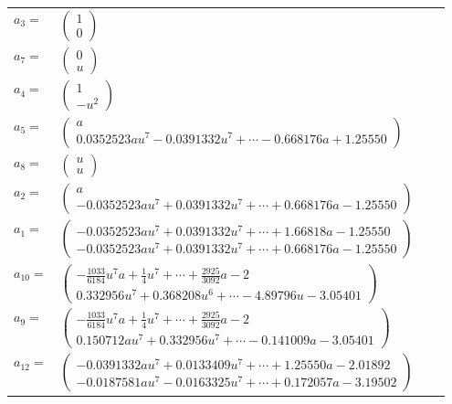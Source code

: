 \documentclass[1p]{elsarticle_modified}
\theoremstyle{definition}
\begin{document}
\begin{tabular}{m{7pt} m{180pt} m{7pt} m{180pt} }
\flushright $a_{3}=$&$\begin{pmatrix}1\\0\end{pmatrix}$ \\
\flushright $a_{7}=$&$\begin{pmatrix}0\\u\end{pmatrix}$ \\
\flushright $a_{4}=$&$\begin{pmatrix}1\\- u^2\end{pmatrix}$ \\
\flushright $a_{5}=$&$\begin{pmatrix}a\\0.0352523 a u^{7}-0.0391332 u^{7}+\cdots-0.668176 a+1.25550\end{pmatrix}$ \\
\flushright $a_{8}=$&$\begin{pmatrix}u\\u\end{pmatrix}$ \\
\flushright $a_{2}=$&$\begin{pmatrix}a\\-0.0352523 a u^{7}+0.0391332 u^{7}+\cdots+0.668176 a-1.25550\end{pmatrix}$ \\
\flushright $a_{1}=$&$\begin{pmatrix}-0.0352523 a u^{7}+0.0391332 u^{7}+\cdots+1.66818 a-1.25550\\-0.0352523 a u^{7}+0.0391332 u^{7}+\cdots+0.668176 a-1.25550\end{pmatrix}$ \\
\flushright $a_{10}=$&$\begin{pmatrix}-\frac{1033}{6184} u^7 a+\frac{1}{4} u^7+\cdots+\frac{2925}{3092} a-2\\0.332956 u^{7}+0.368208 u^{6}+\cdots-4.89796 u-3.05401\end{pmatrix}$ \\
\flushright $a_{9}=$&$\begin{pmatrix}-\frac{1033}{6184} u^7 a+\frac{1}{4} u^7+\cdots+\frac{2925}{3092} a-2\\0.150712 a u^{7}+0.332956 u^{7}+\cdots-0.141009 a-3.05401\end{pmatrix}$ \\
\flushright $a_{12}=$&$\begin{pmatrix}-0.0391332 a u^{7}+0.0133409 u^{7}+\cdots+1.25550 a-2.01892\\-0.0187581 a u^{7}-0.0163325 u^{7}+\cdots+0.172057 a-3.19502\end{pmatrix}$ \\

\end{tabular}
\end{document}
